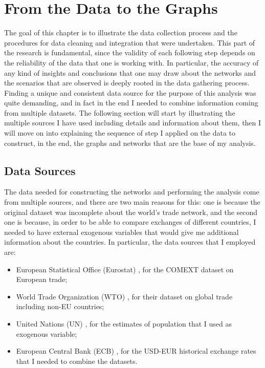 
\chapter{From the Data to the Graphs}
The goal of this chapter is to illustrate the data collection process and the procedures for data cleaning and integration that were undertaken. This part of the research is fundamental, since the validity of each following step depends on the reliability of the data that one is working with. In particular, the accuracy of any kind of insights and conclusions that one may draw about the networks and the scenarios that are observed is deeply rooted in the data gathering process.
Finding a unique and consistent data source for the purpose of this analysis was quite demanding, and in fact in the end I needed to combine information coming from multiple datasets. The following section will start by illustrating the multiple sources I have used including details and information about them, then I will move on into explaining the sequence of step I applied on the data to construct, in the end, the graphs and networks that are the base of my analysis.

\section{Data Sources}

The data needed for constructing the networks and performing the analysis come from multiple sources, and there are two main reasons for this: one is because the original dataset was incomplete about the world's trade network, and the second one is because, in order to be able to compare exchanges of different countries, I needed to have external exogenous variables that would give me additional information about the countries. In particular, the data sources that I employed are:
\begin{itemize}
    \item European Statistical Office (Eurostat) \cite{eurostat2022comext}, for the COMEXT dataset on European trade;
    \item World Trade Organization (WTO) \cite{wto2022stats}, for their dataset on global trade including non-EU countries;
    \item United Nations (UN) \cite{un2022population}, for the estimates of population that I used as exogenous variable;
    \item European Central Bank (ECB) \cite{ecb2021usdeur}, for the USD-EUR historical exchange rates that I needed to combine the datasets.
\end{itemize}

